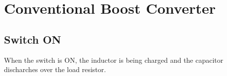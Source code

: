 \chapter{Conventional Boost Converter}\label{ch:CBC}

\section{Switch ON}\label{sec:SON}

When the switch is ON, the inductor is being charged and the capacitor discharches over the load resistor.

